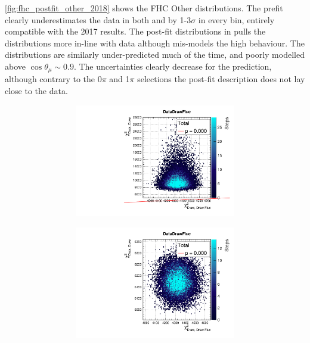 \autoref{fig:fhc_postfit_other_2018} shows the FHC Other distributions. The prefit clearly underestimates the data in both \pmu and \cosmu by 1-3$\sigma$ in every bin, entirely compatible with the 2017 results. The post-fit distributions in \pmu pulls the distributions more in-line with data although mis-models the high \pmu behaviour. The \cosmu distributions are similarly under-predicted much of the time, and poorly modelled above $\cos\theta_\mu \sim 0.9$. The uncertainties clearly decrease for the prediction, although contrary to the 0$\pi$ and 1$\pi$ selections the post-fit description does not lay close to the data.
\begin{figure}[h]
	\begin{subfigure}[t]{\textwidth}
		\begin{subfigure}[t]{0.24\textwidth}
			\includegraphics[width=\textwidth, trim={0mm 0mm 0mm 8mm}, clip,page=28]{figures/mach3/2018/data/2018a_FixedCov_RedCov_Mpi_Data_merge_PriorPred_procs}
		\end{subfigure}
		\begin{subfigure}[t]{0.24\textwidth}
			\includegraphics[width=\textwidth, trim={0mm 0mm 0mm 8mm}, clip,page=28]{figures/mach3/2018/data/2018a_FixedCov_RedCov_Mpi_Data_merge_PostPredStore_FullLLH_procs}

\end{subfigure}
\end{subfigure}
\end{figure}
